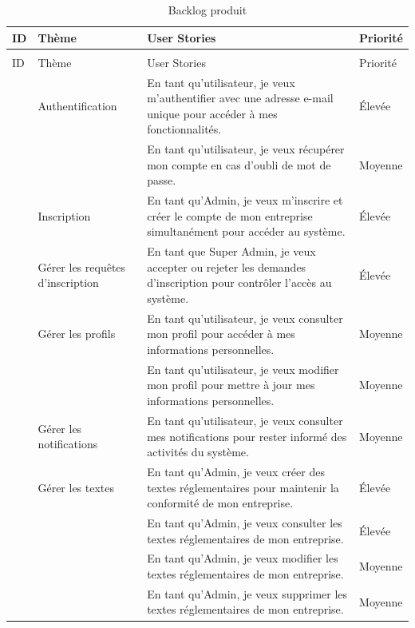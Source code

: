 \begin{longtable}{|>{\raggedright\arraybackslash}p{0.5cm}|
                  >{\raggedright\arraybackslash}p{3cm}|
                  >{\raggedright\arraybackslash}p{9.5cm}|
                  >{\raggedright\arraybackslash}p{2.5cm}|}
\caption{Backlog produit}\label{tab:user_stories}\\
\hline
ID & Thème & User Stories & Priorité \\
\hline
\endfirsthead
\multicolumn{4}{c}{\tablename\ \thetable\ -- suite} \\
\hline
ID & Thème & User Stories & Priorité \\
\hline
\endhead
1 & Authentification & En tant qu'utilisateur, je veux m'authentifier avec une adresse e-mail unique pour accéder à mes fonctionnalités. & Élevée \\
\cline{3-4}
& & En tant qu'utilisateur, je veux récupérer mon compte en cas d'oubli de mot de passe. & Moyenne \\
\hline
2 & Inscription & En tant qu'Admin, je veux m'inscrire et créer le compte de mon entreprise simultanément pour accéder au système. & Élevée \\
\hline
3 & Gérer les requêtes d'inscription & En tant que Super Admin, je veux accepter ou rejeter les demandes d'inscription pour contrôler l'accès au système. & Élevée \\
\hline
4 & Gérer les profils & En tant qu'utilisateur, je veux consulter mon profil pour accéder à mes informations personnelles. & Moyenne \\
\cline{3-4}
& & En tant qu'utilisateur, je veux modifier mon profil pour mettre à jour mes informations personnelles. & Moyenne \\
\hline
5 & Gérer les notifications & En tant qu'utilisateur, je veux consulter mes notifications pour rester informé des activités du système. & Moyenne \\
\hline
6 & Gérer les textes & En tant qu'Admin, je veux créer des textes réglementaires pour maintenir la conformité de mon entreprise. & Élevée \\
\cline{3-4}
& & En tant qu'Admin, je veux consulter les textes réglementaires de mon entreprise. & Élevée \\
\cline{3-4}
& & En tant qu'Admin, je veux modifier les textes réglementaires de mon entreprise. & Moyenne \\
\cline{3-4}
& & En tant qu'Admin, je veux supprimer les textes réglementaires de mon entreprise. & Moyenne \\

\end{longtable}
